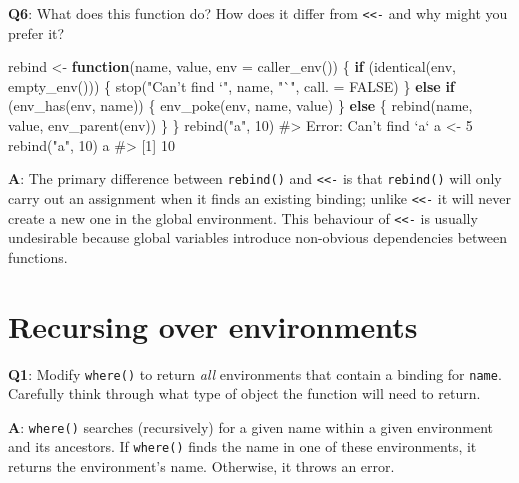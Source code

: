 \documentclass[
]{krantz}
\makeatletter
\newenvironment{Shaded}{\begin{snugshade}}{\end{snugshade}}
\newcommand{\CommentTok}[1]{\textcolor[rgb]{0.56,0.35,0.01}{\textit{#1}}}
\newcommand{\ControlFlowTok}[1]{\textcolor[rgb]{0.13,0.29,0.53}{\textbf{#1}}}
\newcommand{\DataTypeTok}[1]{\textcolor[rgb]{0.13,0.29,0.53}{#1}}
\newcommand{\DecValTok}[1]{\textcolor[rgb]{0.00,0.00,0.81}{#1}}
\newcommand{\KeywordTok}[1]{\textcolor[rgb]{0.13,0.29,0.53}{\textbf{#1}}}
\newcommand{\NormalTok}[1]{#1}
\newcommand{\OtherTok}[1]{\textcolor[rgb]{0.56,0.35,0.01}{#1}}
\newcommand{\StringTok}[1]{\textcolor[rgb]{0.31,0.60,0.02}{#1}}
\newenvironment{kframe}{%
\medskip{}
\setlength{\fboxsep}{.8em}
 \def\at@end@of@kframe{}%
 \ifinner\ifhmode%
  \def\at@end@of@kframe{\end{minipage}}%
  \begin{minipage}{\columnwidth}%
 \fi\fi%
 \def\FrameCommand##1{\hskip\@totalleftmargin \hskip-\fboxsep
 \colorbox{shadecolor}{##1}\hskip-\fboxsep
     \hskip-\linewidth \hskip-\@totalleftmargin \hskip\columnwidth}%
 \MakeFramed {\advance\hsize-\width
   \@totalleftmargin\z@ \linewidth\hsize
   \@setminipage}}%
 {\par\unskip\endMakeFramed%
 \at@end@of@kframe}
\renewenvironment{Shaded}{\begin{kframe}}{\end{kframe}}
\renewcommand{\KeywordTok} [1]{\textcolor[rgb]{0.00,0.44,0.13}{{#1}}}
\renewcommand{\DataTypeTok}[1]{\textcolor[rgb]{0.56,0.13,0.00}{{#1}}}
\renewcommand{\DecValTok}  [1]{\textcolor[rgb]{0.25,0.63,0.44}{{#1}}}
\renewcommand{\StringTok}  [1]{\textcolor[rgb]{0.25,0.44,0.63}{{#1}}}
\renewcommand{\CommentTok} [1]{\textcolor[rgb]{0.38,0.63,0.69}{{#1}}}
\renewcommand{\OtherTok}   [1]{\textcolor[rgb]{0.00,0.44,0.13}{{#1}}}
\renewcommand{\NormalTok}  [1]{{#1}}
\makeatother
\begin{document}
\textbf{{Q6}}: What does this function do? How does it differ from \texttt{\textless{}\textless{}-} and why might you prefer it?

\begin{Shaded}
\begin{Highlighting}[]
\NormalTok{rebind <-}\StringTok{ }\ControlFlowTok{function}\NormalTok{(name, value, }\DataTypeTok{env =} \KeywordTok{caller_env}\NormalTok{()) \{}
  \ControlFlowTok{if}\NormalTok{ (}\KeywordTok{identical}\NormalTok{(env, }\KeywordTok{empty_env}\NormalTok{())) \{}
    \KeywordTok{stop}\NormalTok{(}\StringTok{"Can't find `"}\NormalTok{, name, }\StringTok{"`"}\NormalTok{, }\DataTypeTok{call. =} \OtherTok{FALSE}\NormalTok{)}
\NormalTok{  \} }\ControlFlowTok{else} \ControlFlowTok{if}\NormalTok{ (}\KeywordTok{env_has}\NormalTok{(env, name)) \{}
    \KeywordTok{env_poke}\NormalTok{(env, name, value)}
\NormalTok{  \} }\ControlFlowTok{else}\NormalTok{ \{}
    \KeywordTok{rebind}\NormalTok{(name, value, }\KeywordTok{env_parent}\NormalTok{(env))}
\NormalTok{  \}}
\NormalTok{\}}
\KeywordTok{rebind}\NormalTok{(}\StringTok{"a"}\NormalTok{, }\DecValTok{10}\NormalTok{)}
\CommentTok{#> Error: Can't find `a`}
\NormalTok{a <-}\StringTok{ }\DecValTok{5}
\KeywordTok{rebind}\NormalTok{(}\StringTok{"a"}\NormalTok{, }\DecValTok{10}\NormalTok{)}
\NormalTok{a}
\CommentTok{#> [1] 10}
\end{Highlighting}
\end{Shaded}

\textbf{{A}}: The primary difference between \texttt{rebind()} and \texttt{\textless{}\textless{}-} is that \texttt{rebind()} will only carry out an assignment when it finds an existing binding; unlike \texttt{\textless{}\textless{}-} it will never create a new one in the global environment. This behaviour of \texttt{\textless{}\textless{}-} is usually undesirable because global variables introduce non-obvious dependencies between functions.

\hypertarget{recursing-over-environments}{%
\section{Recursing over environments}\label{recursing-over-environments}}

\textbf{{Q1}}: Modify \texttt{where()} to return \emph{all} environments that contain a binding for \texttt{name}. Carefully think through what type of object the function will need to return.

\textbf{{A}}: \texttt{where()} searches (recursively) for a given name within a given environment and its ancestors. If \texttt{where()} finds the name in one of these environments, it returns the environment's name. Otherwise, it throws an error.
\end{document}
